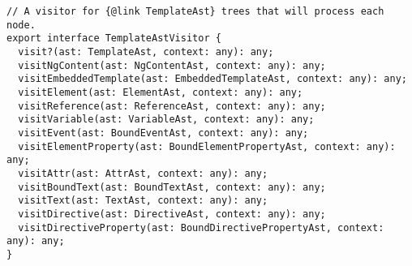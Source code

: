 \begin{verbatim}
// A visitor for {@link TemplateAst} trees that will process each node.
export interface TemplateAstVisitor {
  visit?(ast: TemplateAst, context: any): any;
  visitNgContent(ast: NgContentAst, context: any): any;
  visitEmbeddedTemplate(ast: EmbeddedTemplateAst, context: any): any;
  visitElement(ast: ElementAst, context: any): any;
  visitReference(ast: ReferenceAst, context: any): any;
  visitVariable(ast: VariableAst, context: any): any;
  visitEvent(ast: BoundEventAst, context: any): any;
  visitElementProperty(ast: BoundElementPropertyAst, context: any): any;
  visitAttr(ast: AttrAst, context: any): any;
  visitBoundText(ast: BoundTextAst, context: any): any;
  visitText(ast: TextAst, context: any): any;
  visitDirective(ast: DirectiveAst, context: any): any;
  visitDirectiveProperty(ast: BoundDirectivePropertyAst, context: any): any;
}
\end{verbatim}
